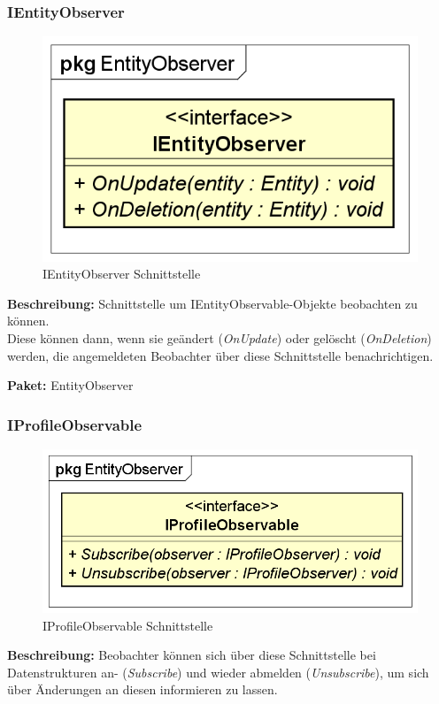 \documentclass[a4paper]{scrreprt}
\begin{document}
\subsubsection{IEntityObserver}
\begin{figure}[H]
\centering
\includegraphics[width=0.75\textheight]{graphics/Klassendiagramme/Model/IEntityObserver.png}
\caption{IEntityObserver Schnittstelle}
\end{figure}
\textbf{Beschreibung:} Schnittstelle um IEntityObservable-Objekte beobachten zu können. \\
Diese können dann, wenn sie geändert (\textit{OnUpdate}) oder gelöscht (\textit{OnDeletion}) werden, die angemeldeten Beobachter über diese Schnittstelle benachrichtigen.

\textbf{Paket:} EntityObserver

\subsubsection{IProfileObservable}
\begin{figure}[H]
\centering
\includegraphics[width=0.75\textheight]{graphics/Klassendiagramme/Model/IProfileObservable.png}
\caption{IProfileObservable Schnittstelle}
\end{figure}
\textbf{Beschreibung:} Beobachter können sich über diese Schnittstelle bei Datenstrukturen an- (\textit{Subscribe}) und wieder abmelden (\textit{Unsubscribe}), um sich über Änderungen an diesen informieren zu lassen.
\end{document}

